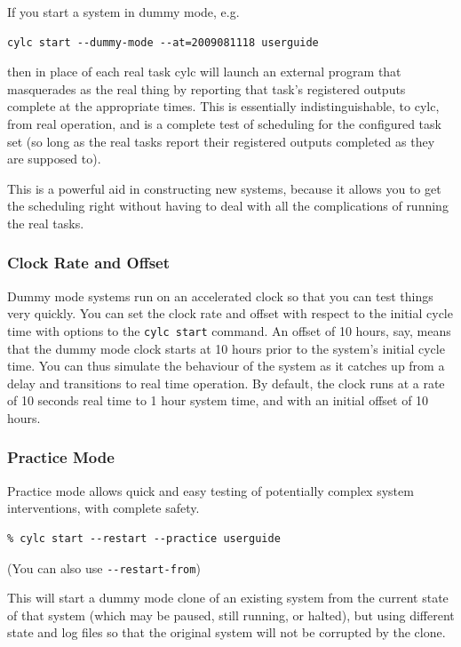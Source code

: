 \documentclass[11pt,a4paper]{article}
\begin{document}
If you start a system in dummy mode, e.g.\:

\begin{lstlisting}
cylc start --dummy-mode --at=2009081118 userguide
\end{lstlisting}

then in place of each real task cylc will launch an external program
that masquerades as the real thing by reporting that task's registered
outputs complete at the appropriate times. This is essentially
indistinguishable, to cylc, from real operation, and is a complete test
of scheduling for the configured task set (so long as the real tasks
report their registered outputs completed as they are supposed to). 

This is a powerful aid in constructing new systems, because it allows
you to get the scheduling right without having to deal with all the
complications of running the real tasks.

\subsubsection{Clock Rate and Offset}

Dummy mode systems run on an accelerated clock so that you can test
things very quickly. You can set the clock rate and offset with respect
to the initial cycle time with options to the \lstinline=cylc start=
command. An offset of 10 hours, say, means that the dummy mode clock
starts at 10 hours prior to the system's initial cycle time.  You can
thus simulate the behaviour of the system as it catches up from a delay
and transitions to real time operation.  By default, the clock runs at a
rate of 10 seconds real time to 1 hour system time, and with an initial
offset of 10 hours. 

\subsubsection{Practice Mode}

Practice mode allows quick and easy testing of potentially complex
system interventions, with complete safety.

\begin{lstlisting}
% cylc start --restart --practice userguide
\end{lstlisting}
(You can also use \lstinline=--restart-from=)

This will start a dummy mode clone of an existing system from the
current state of that system (which may be paused, still running, or
halted), but using different state and log files so that the original
system will not be corrupted by the clone.
\end{document}
